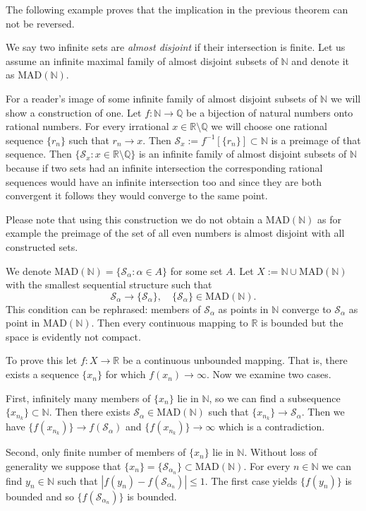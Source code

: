 The following example proves that the implication in the previous theorem can not be reversed.

\begin{example}\label{ex:madn}
We say two infinite sets are \emph{almost disjoint} if their intersection is finite. Let us assume an infinite maximal family of almost disjoint subsets of $\mathbb{N}$ and denote it as $\mathrm{MAD}(\mathbb{N})$.
	
For a reader's image of some infinite family of almost disjoint subsets of $\mathbb{N}$ we will show a construction of one. Let $f:\mathbb{N}\to\mathbb{Q}$ be a bijection of natural numbers onto rational numbers. For every irrational $x\in\mathbb{R}\setminus\mathbb{Q}$ we will choose one rational sequence $\{r_n\}$ such that $r_n\to x$. Then $\mathcal{S}_x:=f^{-1}[\{r_n\}]\subset \mathbb{N}$ is a preimage of that sequence. Then  $\{\mathcal{S}_x: x\in\mathbb{R}\setminus\mathbb{Q}\}$ is an infinite family of almost disjoint subsets of $\mathbb{N}$ because if two sets had an infinite intersection the corresponding rational sequences would have an infinite intersection too and since they are both convergent it follows they would converge to the same point.

Please note that using this construction we do not obtain a $\mathrm{MAD}(\mathbb{N})$ as for example the preimage of the set of all even numbers is almost disjoint with all constructed sets.

We denote $\mathrm{MAD}(\mathbb{N})=\{\mathcal{S}_\alpha: \alpha\in A\}$ for some set $A$. Let $X:=\mathbb{N}\cup\mathrm{MAD}(\mathbb{N})$ with the smallest sequential structure such that
\[
	\mathcal{S}_\alpha\to\{\mathcal{S}_\alpha\},\quad \{\mathcal{S}_\alpha\}\in \mathrm{MAD}(\mathbb{N}).
\]
This condition can be rephrased: members of $\mathcal{S}_\alpha$ as points in $\mathbb{N}$ converge to $\mathcal{S}_\alpha$ as point in $\mathrm{MAD}(\mathbb{N})$.
Then every continuous mapping to $\mathbb{R}$ is bounded but the space is evidently not compact.

To prove this let $f:X\to\mathbb{R}$ be a continuous unbounded mapping. That is, there exists a sequence $\{x_n\}$ for which $f(x_n)\to\infty$. Now we examine two cases.

First, infinitely many members of $\{x_n\}$ lie in $\mathbb{N}$, so we can find a subsequence $\{x_{n_k}\}\subset\mathbb{N}$. Then there exists $\mathcal{S}_\alpha\in \mathrm{MAD}(\mathbb{N})$ such that $\{x_{n_k}\}\to\mathcal{S}_\alpha$. Then we have $\{f(x_{n_k})\}\to f(\mathcal{S}_\alpha)$ and $\{f(x_{n_k})\}\to \infty$ which is a contradiction.

Second, only finite number of members of $\{x_n\}$ lie in $\mathbb{N}$. Without loss of generality we suppose that $\{x_n\}=\{\mathcal{S}_{\alpha_n}\}\subset\mathrm{MAD}(\mathbb{N})$. For every $n\in\mathbb{N}$ we can find $y_n\in\mathbb{N}$ such that $|f(y_n)-f(\mathcal{S}_{\alpha_n})|\le1$. The first case yields $\{f(y_n)\}$ is bounded and so $\{f(\mathcal{S}_{\alpha_n})\}$ is bounded.
\end{example}


